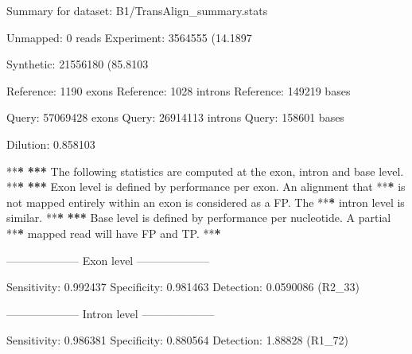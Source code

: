 \documentclass[]{article}
\newenvironment{Shaded}{\begin{snugshade}}{\end{snugshade}}
\newcommand{\DecValTok}[1]{\textcolor[rgb]{0.00,0.00,0.81}{{#1}}}
\newcommand{\FloatTok}[1]{\textcolor[rgb]{0.00,0.00,0.81}{{#1}}}
\newcommand{\StringTok}[1]{\textcolor[rgb]{0.31,0.60,0.02}{{#1}}}
\newcommand{\ErrorTok}[1]{\textbf{{#1}}}
\newcommand{\NormalTok}[1]{{#1}}
\begin{document}
\begin{Shaded}
\begin{Highlighting}[]
\NormalTok{Summary for dataset:}\StringTok{ }\NormalTok{B1/TransAlign_summary.stats}

   \NormalTok{Unmapped:}\StringTok{   }\DecValTok{0} \NormalTok{reads}
   \NormalTok{Experiment:}\StringTok{ }\DecValTok{3564555} \NormalTok{(}\FloatTok{14.1897}\NormalTok{%
   \NormalTok{Synthetic:}\StringTok{  }\DecValTok{21556180} \NormalTok{(}\FloatTok{85.8103}\NormalTok{%

   \NormalTok{Reference:}\StringTok{  }\DecValTok{1190} \NormalTok{exons}
   \NormalTok{Reference:}\StringTok{  }\DecValTok{1028} \NormalTok{introns}
   \NormalTok{Reference:}\StringTok{  }\DecValTok{149219} \NormalTok{bases}

   \NormalTok{Query:}\StringTok{      }\DecValTok{57069428} \NormalTok{exons}
   \NormalTok{Query:}\StringTok{      }\DecValTok{26914113} \NormalTok{introns}
   \NormalTok{Query:}\StringTok{      }\DecValTok{158601} \NormalTok{bases}

   \NormalTok{Dilution:}\StringTok{   }\FloatTok{0.858103}

   \NormalTok{**}\ErrorTok{*}
\StringTok{   }\ErrorTok{***}\StringTok{ }\NormalTok{The following statistics are computed at the exon, intron and base level.}
   \NormalTok{**}\ErrorTok{*}
\StringTok{   }\ErrorTok{***}\StringTok{ }\NormalTok{Exon level is defined by performance per exon. An alignment that}
   \NormalTok{**}\ErrorTok{*}\StringTok{ }\NormalTok{is not mapped entirely within an exon is considered as a FP. The}
   \NormalTok{**}\ErrorTok{*}\StringTok{ }\NormalTok{intron level is similar.}
   \NormalTok{**}\ErrorTok{*}
\StringTok{   }\ErrorTok{***}\StringTok{ }\NormalTok{Base level is defined by performance per nucleotide. A partial}
   \NormalTok{**}\ErrorTok{*}\StringTok{ }\NormalTok{mapped read will have FP and TP.}
   \NormalTok{**}\ErrorTok{*}

\StringTok{   }\NormalTok{--------------------}\StringTok{ }\NormalTok{Exon level --------------------}

\StringTok{   }\NormalTok{Sensitivity:}\StringTok{ }\FloatTok{0.992437}
   \NormalTok{Specificity:}\StringTok{ }\FloatTok{0.981463}
   \NormalTok{Detection:}\StringTok{   }\FloatTok{0.0590086} \NormalTok{(R2_33)}

   \NormalTok{--------------------}\StringTok{ }\NormalTok{Intron level --------------------}

\StringTok{   }\NormalTok{Sensitivity:}\StringTok{ }\FloatTok{0.986381}
   \NormalTok{Specificity:}\StringTok{ }\FloatTok{0.880564}
   \NormalTok{Detection:}\StringTok{   }\FloatTok{1.88828} \NormalTok{(R1_72)}

}}
\end{Highlighting}
\end{Shaded}
\end{document}
